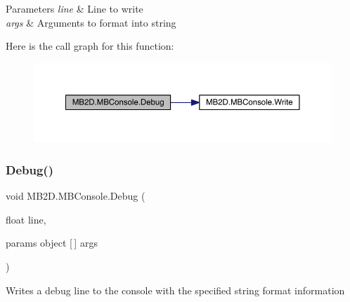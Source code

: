 \begin{DoxyParams}{Parameters}
{\em line} & Line to write\\
\hline
{\em args} & Arguments to format into string\\
\hline
\end{DoxyParams}
Here is the call graph for this function\+:
\nopagebreak
\begin{figure}[H]
\begin{center}
\leavevmode
\includegraphics[width=350pt]{class_m_b2_d_1_1_m_b_console_aef53935b8ae3c6cd2b87a81e5dbcdf1e_cgraph}
\end{center}
\end{figure}
\hypertarget{class_m_b2_d_1_1_m_b_console_a918307d1a003684b1fa3e0d11243b1f9}{}\label{class_m_b2_d_1_1_m_b_console_a918307d1a003684b1fa3e0d11243b1f9} 
\subsubsection{\texorpdfstring{Debug()}{Debug()}\hspace{0.1cm}{\footnotesize\ttfamily [4/4]}}
{\footnotesize\ttfamily void M\+B2\+D.\+M\+B\+Console.\+Debug (\begin{DoxyParamCaption}\item[{float}]{line,  }\item[{params object \mbox{[}$\,$\mbox{]}}]{args }\end{DoxyParamCaption})\hspace{0.3cm}{\ttfamily [inline]}}



Writes a debug line to the console with the specified string format information 


